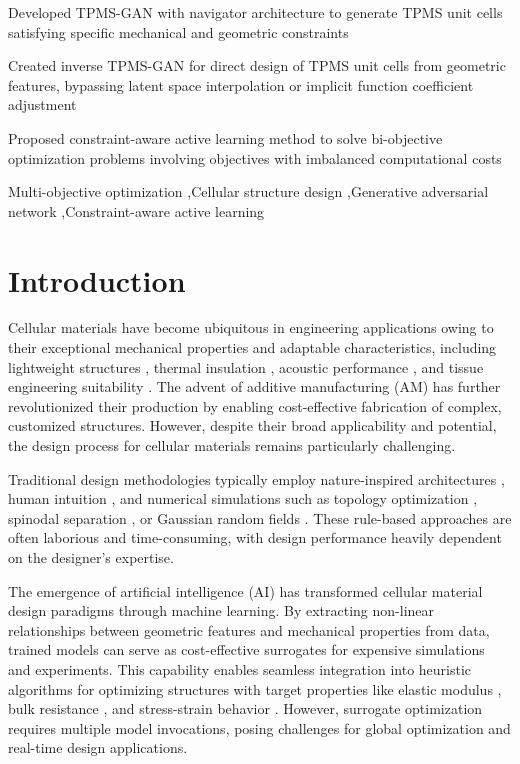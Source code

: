 \documentclass[preprint,review,12pt,authoryear]{elsarticle}
\begin{document}
\begin{frontmatter}
\begin{highlights}
\item Developed TPMS-GAN with navigator architecture to generate TPMS unit cells satisfying specific mechanical and geometric constraints
\item Created inverse TPMS-GAN for direct design of TPMS unit cells from geometric features, bypassing latent space interpolation or implicit function coefficient adjustment
\item Proposed constraint-aware active learning method to solve bi-objective optimization problems involving objectives with imbalanced computational costs
\end{highlights}

\begin{keyword}
Multi-objective optimization \sep Cellular structure design \sep Generative adversarial network \sep Constraint-aware active learning
\end{keyword}
\end{frontmatter}

\section{Introduction}
Cellular materials have become ubiquitous in engineering applications owing to their exceptional mechanical properties and adaptable characteristics, including lightweight structures \citep{Schaedler2011, Berger2017, Han2015, Tancogne-Dejean2018}, thermal insulation \citep{Li2021d}, acoustic performance \citep{Sekar2024}, and tissue engineering suitability \citep{Li2024c,Peng2023,Tabrizian2024}. The advent of additive manufacturing (AM) has further revolutionized their production by enabling cost-effective fabrication of complex, customized structures. However, despite their broad applicability and potential, the design process for cellular materials remains particularly challenging.

Traditional design methodologies typically employ nature-inspired architectures \citep{Fernandes2021,Bandyopadhyay2021,Sethi2023}, human intuition \citep{Schaedler2011,Berger2017,Xu2016a}, and numerical simulations such as topology optimization \citep{Andersen2019,Bendsoe1999,Collet2018}, spinodal separation \citep{Hsieh2019,Roding2022}, or Gaussian random fields \citep{Kumar2020,Zheng2020abc}. These rule-based approaches are often laborious and time-consuming, with design performance heavily dependent on the designer's expertise.

The emergence of artificial intelligence (AI) has transformed cellular material design paradigms through machine learning. By extracting non-linear relationships between geometric features and mechanical properties from data, trained models can serve as cost-effective surrogates for expensive simulations and experiments. This capability enables seamless integration into heuristic algorithms for optimizing structures with target properties like elastic modulus \citep{Garland2021,Lee2022,Chen2024b}, bulk resistance \citep{Liu2020a}, and stress-strain behavior \citep{Deng2022a,Ma2020b}. However, surrogate optimization requires multiple model invocations, posing challenges for global optimization and real-time design applications.
\end{document}
